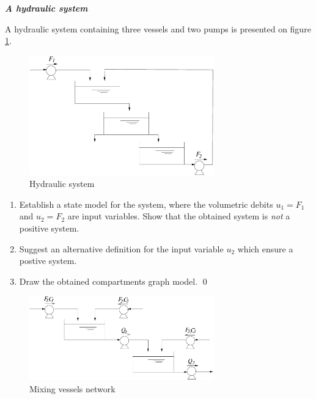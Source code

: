 \begin{exercice}{\bf \em A hydraulic system}

A hydraulic system containing three vessels and two pumps is presented on figure \ref{Fig:systhydr}.
\begin{figure}[h]
\begin{center}
\includegraphics[width=8cm]{images/systhydr}
\caption{Hydraulic system}
\label{Fig:systhydr}
\end{center} 
\end{figure}
\begin{enumerate}
\item Establish a state model for the system, where the volumetric debits $u_1 = F_1$ and $u_2 = F_2$ are input variables. 
Show that the obtained system is {\it not} a positive system. 
\item Suggest an alternative definition for the input variable $u_2$ which ensure a postive system. 
\item Draw the obtained compartments graph model. \qed
\end{enumerate}
\end{exercice}
\vv 

\begin{figure}[!ht] 
\begin{center}
\includegraphics[width=8cm]{images/cuvmel}
\caption{Mixing vessels network}
\label{Fig:cuvmel}
\end{center} 
\end{figure}

